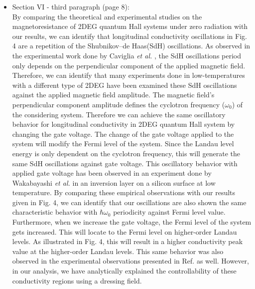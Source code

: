 \documentclass{article}
\begin{document}
\begin{itemize}
  \item Section VI - third paragraph (page 8):\\
  {\color{Red}
  By comparing the theoretical \cite{ando72,ando74_1,ando74_2,ando74_3,ando74_4,ando82,endo09} and experimental \cite{endo09,wakabayashi78,ochiai190,mancoff96,arapov02,grbic04,caviglia10} studies on the magnetoresistance of 2DEG quantum Hall systems under zero radiation with our results, we can identify that longitudinal conductivity oscillations in Fig. 4 are a repetition of the Shubnikov–de Haas(SdH) oscillations.
  As observed in the experimental work done by Caviglia \textit{et al.} \cite{caviglia10}, the SdH oscillations period only depends on the perpendicular component of the applied magnetic field.
  Therefore, we can identify that many experiments done in low-temperatures \cite{endo09,ochiai190,mancoff96,arapov02,grbic04,caviglia10} with a different type of 2DEG have been examined these SdH oscillations against the applied magnetic field amplitude.
  The magnetic field's perpendicular component amplitude defines the cyclotron frequency ($\omega_0$) of the considering system.
  Therefore we can achieve the same oscillatory behavior for longitudinal conductivity in 2DEG quantum Hall system by changing the gate voltage. The  change of the gate voltage applied to the system will modify the Fermi level of the system.
  Since the Landau level energy is only dependent on the cyclotron frequency, this will generate the same SdH oscillations against gate voltage.
  This oscillatory behavior with applied gate voltage has been observed in an  experiment done by Wakabayashi \textit{et al.} \cite{wakabayashi78} in an inversion layer on a silicon surface at low temperature. By comparing these empirical observations with our results given in Fig. 4, we can identify that our oscillations are also shown the same characteristic behavior with $\hbar\omega_0$ periodicity against Fermi level value. Furthermore, when we increase the gate voltage, the Fermi level of the system gets increased. This will locate to the Fermi level on higher-order Landau levels. As illustrated in Fig. 4, this will result in a higher conductivity peak value at the higher-order Landau levels. This same behavior was also observed in the experimental observations presented in Ref. \cite{wakabayashi78} as well. However, in our analysis, we have analytically explained the controllability of these conductivity regions using a dressing field.
  }
\end{itemize}
\end{document}
